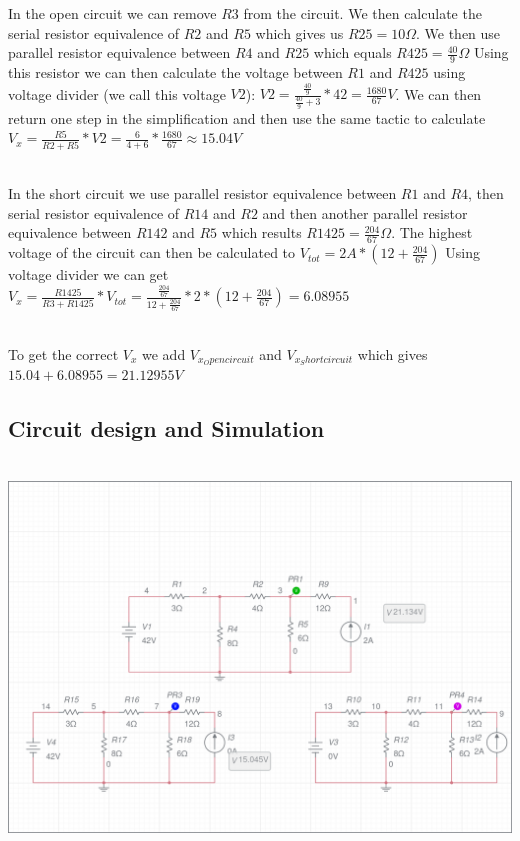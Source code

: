 \documentclass[11pt]{article}
\begin{document}
\noindent
In the open circuit we can remove $R3$ from the circuit. We then calculate the serial resistor equivalence of $R2$ and $R5$
which gives us $R25 = 10\Omega$. We then use parallel resistor equivalence between $R4$ and $R25$ which equals $R425 = \frac{40}{9} \Omega$ 
Using this resistor we can then calculate the voltage between $R1$ and $R425$ using voltage divider (we call this voltage $V2$): 
$V2 = \frac{\frac{40}{9}}{\frac{40}{9} + 3} * 42 = \frac{1680}{67}V$. We can then return one step in the simplification
and then use the same tactic to calculate 
\\
$V_{x} = \frac{R5}{R2 + R5} * V2 = \frac{6}{4 + 6} * \frac{1680}{67} \approx 15.04V$

\noindent
\\
In the short circuit we use parallel resistor equivalence between $R1$ and $R4$, then serial resistor equivalence of $R14$ and $R2$ and then another 
parallel resistor equivalence between $R142$ and $R5$ which results $R1425 = \frac{204}{67}\Omega$. The highest voltage of the circuit can then be
 calculated to $V_{tot} = 2A * (12 + \frac{204}{67})$ Using voltage divider we can get $V_{x} = \frac{R1425}{R3 + R1425} * V_{tot} = 
 \frac{\frac{204}{67}}{12 + \frac{204}{67}} * 2 * (12 + \frac{204}{67}) = 6.08955$


\noindent
\\
To get the correct $V_{x}$ we add $V_{x_ Open circuit}$ and $V_{x_ Short circuit}$ which gives $15.04 + 6.08955 = 21.12955V$
 
\subsection[25pt]{\bf{Circuit design and Simulation}}

\noindent
\\
\includegraphics[width=\linewidth]{circuits/Lab 1 Task 3-schematic.png}
\end{document}
